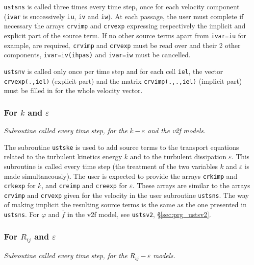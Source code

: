{{{\texttt{ustsns} is called three times every time
step, once for each velocity component (\texttt{ivar} is successively
\texttt{iu}, \texttt{iv} and \texttt{iw}). At each passage, the user must complete
if necessary the arrays \texttt{crvimp}
and \texttt{crvexp} expressing respectively the implicit and explicit part of
the source term. If no other source terms apart from \texttt{ivar=iu} for
example, are required, \texttt{crvimp} and \texttt{crvexp} must be read over and
their 2 other components, \texttt{ivar=iv(ihpas)} and \texttt{ivar=iw}
must be cancelled.

\texttt{ustsnv} is called only once per time step and for each cell \texttt{iel},
the vector \texttt{crvexp(.,iel)} (explicit part) and the matrix \texttt{crvimp(.,.,iel)}
(implicit part) must be filled in for the whole velocity vector.


\subsubsection{For $k$ and $\varepsilon$}

\noindent
\textit{Subroutine called every time step, for the $k-\varepsilon$ and
the v2f models.}

The subroutine \texttt{ustske} is used to add source terms to the transport equations
related to the turbulent kinetics energy $k$ and to the turbulent
dissipation $\varepsilon$.
This subroutine is called every time step (the
treatment of the two variables $k$ and $\varepsilon$ is made
simultaneously). The user is expected to provide the arrays \texttt{crkimp} and
\texttt{crkexp} for $k$, and \texttt{creimp} and \texttt{creexp} for
$\varepsilon$. These arrays are similar to the arrays \texttt{crvimp} and
\texttt{crvexp} given for the velocity in the user subroutine \texttt{ustsns}.
The way of making implicit the resulting source terms is the same as the one
presented in \texttt{ustsns}. For $\varphi$ and $\bar{f}$
in the v2f model, see \texttt{ustsv2}, \S\ref{sec:prg_ustsv2}.

\subsubsection{For $R_{ij}$ and $\varepsilon$}

\noindent
\textit{Subroutine called every time step, for the $R_{ij}-\varepsilon$ models.}

}}}
